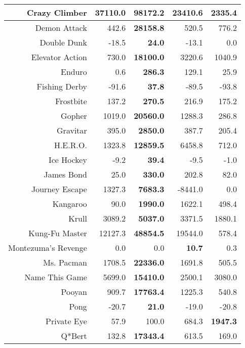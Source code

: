 \documentclass[twoside,11pt]{article}
\newcommand{\gamename}[1]{{\sc #1}}
\begin{document}
\begin{table}[h!]
\begin{center}
\begin{tabular}{|r|r|r|r|r|}
\hline
\gamename{Crazy Climber} & 37110.0& \textbf { 98172.2 }& 23410.6& 2335.4\\
\hline
\gamename{Demon Attack} & 442.6& \textbf { 28158.8 }& 520.5& 776.2\\
\hline
\gamename{Double Dunk} & -18.5& \textbf { 24.0 }& -13.1& 0.0\\
\hline
\gamename{Elevator Action} & 730.0& \textbf { 18100.0 }& 3220.6& 1040.9\\
\hline
\gamename{Enduro} & 0.6& \textbf { 286.3 }& 129.1& 25.9\\
\hline
\gamename{Fishing Derby} & -91.6& \textbf { 37.8 }& -89.5& -93.8\\
\hline
\gamename{Frostbite} & 137.2& \textbf { 270.5 }& 216.9& 175.2\\
\hline
\gamename{Gopher} & 1019.0& \textbf { 20560.0 }& 1288.3& 286.8\\
\hline
\gamename{Gravitar} & 395.0& \textbf { 2850.0 }& 387.7& 205.4\\
\hline
\gamename{H.E.R.O.} & 1323.8& \textbf { 12859.5 }& 6458.8& 712.0\\
\hline
\gamename{Ice Hockey} & -9.2& \textbf { 39.4 }& -9.5& -1.0\\
\hline
\gamename{James Bond} & 25.0& \textbf { 330.0 }& 202.8& 82.0\\
\hline
\gamename{Journey Escape} & 1327.3& \textbf { 7683.3 }& -8441.0& 0.0\\
\hline
\gamename{Kangaroo} & 90.0& \textbf { 1990.0 }& 1622.1& 498.4\\
\hline
\gamename{Krull} & 3089.2& \textbf { 5037.0 }& 3371.5& 1880.1\\
\hline
\gamename{Kung-Fu Master} & 12127.3& \textbf { 48854.5 }& 19544.0& 578.4\\
\hline
\gamename{Montezuma's Revenge} & 0.0& 0.0& \textbf { 10.7 }& 0.3\\
\hline
\gamename{Ms. Pacman} & 1708.5& \textbf { 22336.0 }& 1691.8& 505.5\\
\hline
\gamename{Name This Game} & 5699.0& \textbf { 15410.0 }& 2500.1& 3080.0\\
\hline
\gamename{Pooyan} & 909.7& \textbf { 17763.4 }& 1225.3& 540.8\\
\hline
\gamename{Pong} & -20.7& \textbf { 21.0 }& -19.0& -20.8\\
\hline
\gamename{Private Eye} & 57.9& 100.0& 684.3& \textbf { 1947.3 }\\
\hline
\gamename{Q*Bert} & 132.8& \textbf { 17343.4 }& 613.5& 169.0\\

\end{tabular}
\end{center}
\end{table}
\end{document}
